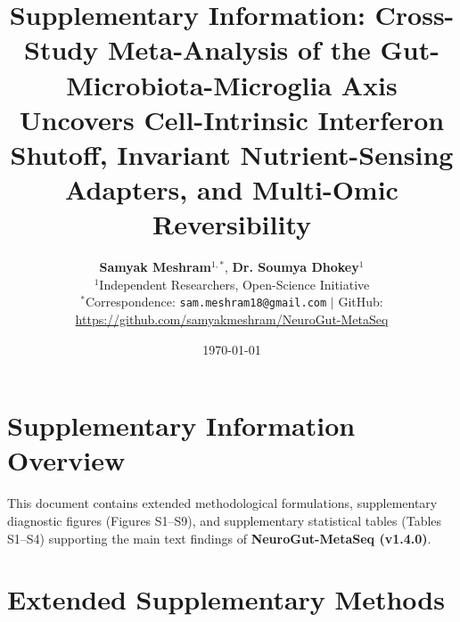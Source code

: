 \documentclass[10pt,a4paper]{article}
\title{\textbf{\Large Supplementary Information: Cross-Study Meta-Analysis of the Gut-Microbiota-Microglia Axis Uncovers Cell-Intrinsic Interferon Shutoff, Invariant Nutrient-Sensing Adapters, and Multi-Omic Reversibility}}
\author{
  \textbf{Samyak Meshram}$^{1,*}$, \textbf{Dr. Soumya Dhokey}$^{1}$ \\[0.4em]
  \small $^{1}$Independent Researchers, Open-Science Initiative \\
  \small $^*$Correspondence: \texttt{sam.meshram18@gmail.com} \quad $|$ \quad GitHub: \url{https://github.com/samyakmeshram/NeuroGut-MetaSeq}
}
\date{\small \today}
\begin{document}
\maketitle

\linenumbers

\section*{Supplementary Information Overview}
This document contains extended methodological formulations, supplementary diagnostic figures (Figures S1--S9), and supplementary statistical tables (Tables S1--S4) supporting the main text findings of \textbf{NeuroGut-MetaSeq (v1.4.0)}.

\tableofcontents

\vspace{1.5em}
\section{Extended Supplementary Methods}
\end{document}
